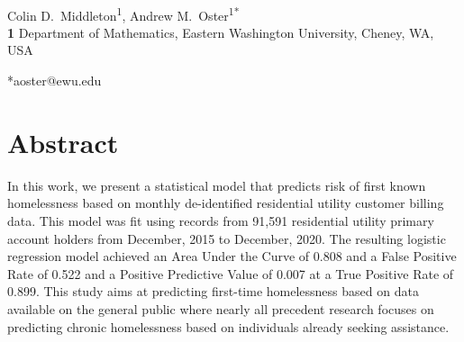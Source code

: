 \documentclass[10pt,letterpaper]{article}
\begin{document}
\vspace*{0.2in}

\begin{flushleft}
{\Large
\textbf{} %
}
\newline
\\
Colin D.\ Middleton\textsuperscript{1},
Andrew M.\ Oster\textsuperscript{1*} \\
\bigskip
\textbf{1} Department of Mathematics, Eastern Washington University, Cheney, WA, USA
\\

\bigskip





*aoster@ewu.edu

\end{flushleft}
\section*{Abstract}
In this work, we present a statistical model that predicts risk of first known homelessness based on monthly de-identified residential utility customer billing data. This model was fit using records from 91,591 residential utility primary account holders from December, 2015 to December, 2020. The resulting logistic regression model achieved an Area Under the Curve of 0.808 and a False Positive Rate of 0.522 and a Positive Predictive Value of 0.007 at a True Positive Rate of 0.899. This study aims at predicting first-time homelessness based on data available on the general public where nearly all precedent research focuses on predicting chronic homelessness based on individuals already seeking assistance.
\end{document}
